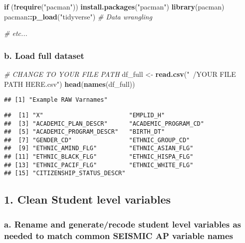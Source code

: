 \documentclass[]{article}
\newenvironment{Shaded}{\begin{snugshade}}{\end{snugshade}}
\newcommand{\KeywordTok}[1]{\textcolor[rgb]{0.13,0.29,0.53}{\textbf{#1}}}
\newcommand{\StringTok}[1]{\textcolor[rgb]{0.31,0.60,0.02}{#1}}
\newcommand{\CommentTok}[1]{\textcolor[rgb]{0.56,0.35,0.01}{\textit{#1}}}
\newcommand{\ControlFlowTok}[1]{\textcolor[rgb]{0.13,0.29,0.53}{\textbf{#1}}}
\newcommand{\OperatorTok}[1]{\textcolor[rgb]{0.81,0.36,0.00}{\textbf{#1}}}
\newcommand{\NormalTok}[1]{#1}
\begin{document}
\begin{Shaded}
\begin{Highlighting}[]
\ControlFlowTok{if}\NormalTok{ (}\OperatorTok{!}\KeywordTok{require}\NormalTok{(}\StringTok{"pacman"}\NormalTok{)) }\KeywordTok{install.packages}\NormalTok{(}\StringTok{"pacman"}\NormalTok{)}
\KeywordTok{library}\NormalTok{(pacman)}
\NormalTok{pacman}\OperatorTok{::}\KeywordTok{p_load}\NormalTok{(}\StringTok{"tidyverse"}\NormalTok{)   }\CommentTok{# Data wrangling}

\CommentTok{# etc...}
\end{Highlighting}
\end{Shaded}

\subsubsection{b. Load full dataset}\label{b.-load-full-dataset}

\begin{Shaded}
\begin{Highlighting}[]
\CommentTok{# CHANGE TO YOUR FILE PATH}
\NormalTok{df_full <-}\StringTok{ }\KeywordTok{read.csv}\NormalTok{(}\StringTok{"~/YOUR FILE PATH HERE.csv"}\NormalTok{)}
\KeywordTok{head}\NormalTok{(}\KeywordTok{names}\NormalTok{(df_full))}
\end{Highlighting}
\end{Shaded}

\begin{verbatim}
## [1] "Example RAW Varnames"
\end{verbatim}

\begin{verbatim}
##  [1] "X"                        "EMPLID_H"                
##  [3] "ACADEMIC_PLAN_DESCR"      "ACADEMIC_PROGRAM_CD"     
##  [5] "ACADEMIC_PROGRAM_DESCR"   "BIRTH_DT"                
##  [7] "GENDER_CD"                "ETHNIC_GROUP_CD"         
##  [9] "ETHNIC_AMIND_FLG"         "ETHNIC_ASIAN_FLG"        
## [11] "ETHNIC_BLACK_FLG"         "ETHNIC_HISPA_FLG"        
## [13] "ETHNIC_PACIF_FLG"         "ETHNIC_WHITE_FLG"        
## [15] "CITIZENSHIP_STATUS_DESCR"
\end{verbatim}

\subsection{1. Clean Student level
variables}\label{clean-student-level-variables}

\subsubsection{a. Rename and generate/recode student level variables as
needed to match common SEISMIC AP variable
names}\label{a.-rename-and-generaterecode-student-level-variables-as-needed-to-match-common-seismic-ap-variable-names}
\end{document}
